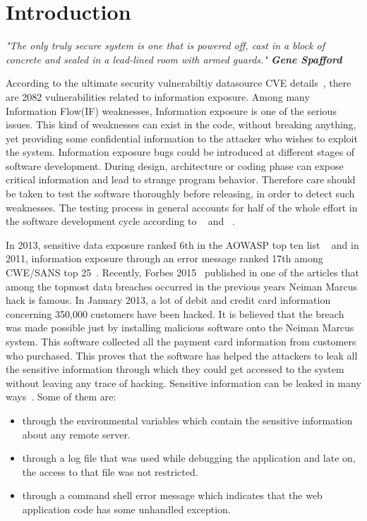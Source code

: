 \let\cleardoublepage\clearpage
\chapter{Introduction}
\label{chapter:Introduction}


\textit{"The only truly secure system is one that is powered off, cast in a block of concrete 
and sealed in a lead-lined room with armed guards."
\textemdash  \textbf{ Gene Spafford}} \smallskip

According to the ultimate security vulnerabiltiy datasource CVE details~\cite{cve:details},
there are 2082 vulnerabilities related to information exposure. Among many Information 
Flow(IF) weaknesses, Information exposure is one of the serious issues.
This kind of weaknesses can exist in the code, without breaking anything, yet
providing some confidential information to the attacker 
who wishes to exploit the system. Information exposure bugs could be introduced
at different stages of software development. During design, architecture 
or coding phase 
can expose critical information and lead to strange program behavior. Therefore
care should be taken to test the software thoroughly before releasing, 
in order to detect such weaknesses.
The testing process in general accounts for half of the whole effort in the software development cycle
according to ~\cite{King:2008} and ~\cite{Kushwaha:test}.

In 2013, sensitive data exposure ranked 
6th in the AOWASP top ten list ~\cite{top:vul} and in 2011, information exposure through an error message ranked 17th 
among CWE/SANS top 25~\cite{top:25}.
Recently, Forbes 2015~\cite{forbes:bill} published in one of the articles that
among the topmost data breaches occurred in the 
previous years Neiman Marcus hack is famous.
In January 2013, a lot of debit and credit card information concerning
350,000 customers have been
hacked. It is believed that the breach was made possible just by installing
malicious software onto the Neiman Marcus system. This software collected all the payment
card information from customers who purchased.
This proves that the software has helped the attackers to leak all the sensitive information
through which they could get accessed to the system without leaving any trace of hacking.
Sensitive information can be leaked in many ways~\cite{mitre:CWE}. Some of them are:\\
\begin{itemize}
 \item through the environmental variables which contain the sensitive information about any remote server.
 \item through a log file that was used while debugging the application and late on, the
 access to that file was not restricted.
 \item through a command shell error message which indicates that the web application code has some unhandled exception.
\end{itemize}

